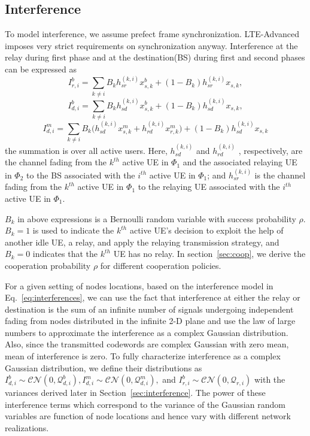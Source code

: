 \subsection{Interference}
To model interference, we assume prefect frame synchronization. LTE-Advanced imposes very strict requirements on synchronization anyway. Interference at the relay during first phase and at the destination(BS) during first and second phases can be expressed as
\begin{equation*} 
I_{r,i}^b = \sum_{k \neq i} B_k h^{(k,i)}_{sr} x_{s,k}^b + (1-B_k)h_{sr}^{(k,i)}x_{s,k} ,
\end{equation*}
\begin{equation*}
I_{d,i}^b = \sum_{k \neq i} B_k h_{sd}^{(k,i)} x^b_{s,k} + (1-B_k)h_{sd}^{(k,i)}x_{s,k},
\end{equation*}
\begin{equation} \label{eq:interferences}
I_{d,i}^m = \sum_{k \neq i} B_k \Big(h_{sd}^{(k,i)} x^m_{s,k} + h_{rd}^{(k,i)} x^m_{r,k}\Big) + (1-B_k)h_{sd}^{(k,i)}x_{s,k}
\end{equation}
the summation is over all active users. Here, $h_{sd}^{(k,i)}$ and $h_{rd}^{(k,i)}$ , respectively, are the channel fading from the $k^{th}$ active UE in $\Phi_1$ and the associated relaying UE in $\Phi_2$ to the BS associated with the $i^{th}$ active UE in $\Phi_1$; and $h_{sr}^{(k,i)}$ is the channel fading from the $k^{th}$ active UE in $\Phi_1$ to the relaying UE associated with the $i^{th}$ active UE in $\Phi_1$.
\par $B_k$ in above expressions is a Bernoulli random variable with success probability $\rho$. $B_k = 1$ is used to indicate the $k^{th}$ active UE's decision to exploit the help of another idle UE, a relay, and apply the relaying transmission strategy, and $B_k = 0$ indicates that the $k^{th}$ UE has no relay. In section~\ref{sec:coop}, we derive the cooperation probability $\rho$ for different cooperation policies.
\par
 For a given setting of nodes locations, based on the
interference model in Eq.~\ref{eq:interferences}, we can use the fact
that interference at either the relay or destination is the
sum of an infinite number of signals undergoing independent fading from nodes distributed in the infinite 2-D plane and use the law of large numbers to approximate the interference as a complex Gaussian distribution.
Also, since the transmitted codewords are complex Gaussian with zero mean, mean of interference is zero. To fully characterize interference as a
complex Gaussian distribution, we define their distributions as $ I_{d,i}^b \sim \mathcal{CN} (0,\mathcal{Q}_{d,i}^b), I_{d,i}
^m \sim \mathcal{CN}(0,\mathcal{Q}_{d,i}^m),$ and $I_{r,i}^b \sim \mathcal{CN}
(0,\mathcal{Q}_{r,i})$ with the variances derived later
in Section~\ref{sec:interference}. The power of these interference terms which
correspond to the variance of the Gaussian random variables
are function of node locations and hence vary with different
network realizations.

